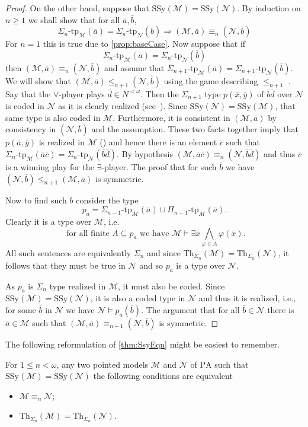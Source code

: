 \documentclass[11pt]{amsart}
\newcommand{\M}{\mathcal{M}}
\newcommand{\N}{\mathcal{N}}
\newcommand{\mc}[1]{\mathcal{#1}}
\newcommand{\PA}{\mathrm{PA}}
\newcommand{\SSy}{\mathrm{SSy}}
\newcommand{\tp}{\mathrm{tp}}
\newcommand{\Th}{\mathrm{Th}}
\def\M{{\mathcal M}}
\def\N{{\mathcal N}}
\theoremstyle{remark}
\newcommand{\ba}{\overline{a}}
\newcommand{\bb}{\overline{b}}
\newcommand{\bc}{\overline{c}}
\newcommand{\bd}{\overline{d}}
\begin{document}
\begin{proof}
    On the other hand, suppose that $\SSy(\mathcal{M}) = \SSy(\mathcal{N})$. By induction on $n\geq 1$ we shall show that for all $\bar{a},\bar{b}$,
\[\Sigma_{n}\text{-}\tp_\M(\ba)=\Sigma_{n}\text{-}\tp_\N(\bb)\Longrightarrow (\mc{M},\bar{a}) \equiv_{n} (\mc{N},\bar{b})\]
    For $n=1$ this is true due to \cref{prop:baseCase}. Now suppose that if $$\Sigma_{n}\text{-}\tp_\M(\ba)=\Sigma_{n}\text{-}\tp_\N(\bb)$$ then $(\mc{M},\bar{a}) \equiv_{n} (\mc{N},\bar{b})$ and assume that $\Sigma_{n+1}\text{-}\tp_\M(\ba)=\Sigma_{n+1}\text{-}\tp_\N(\bb)$. We will show that $(\M,\ba)\leq_{n+1}(\N,\bb)$ using the game describing $\leq_{n+1}$ \cite[Section II.6]{MBook}. Say that the $\forall$-player plays $\bar d\in N^{<\omega}$. 
Then the $\Sigma_{n+1}$ type $p(\bar{x},\bar{y})$ of $\bb\bd$ over $\N$ is coded in $\N$ as it is clearly realized (see~\cite[Lemma 12.1]{Kaye}). Since $\SSy(\N)=\SSy(\M)$, that same type is also coded in $\M$. Furthermore, it is consistent in $(\M,\ba)$ by consistency in $(\N,\bb)$ and the assumption. These two facts together imply that $p(\ba,\bar{y})$ is realized in $\M$ (\cite[Lemma 12.2]{Kaye}) and hence there is an element $\bc$ such that $\Sigma_{n}\text{-}\tp_\M(\ba\bc)=\Sigma_{n}\text{-}\tp_\N(\bb\bd)$. By hypothesis $(\M,\ba\bc)\equiv_{n}(\N,\bb\bd)$ and thus $\bc$ is a winning play for the $\exists$-player. The proof that for such $\bb$ we have $(\N,\bb)\leq_{n+1}(\M,\ba)$ is symmetric.

Now to find such $\bb$ consider the type $$p_a = \Sigma_{n-1}\text{-}\tp_\M(\ba) \cup \Pi_{n-1}\text{-}\tp_\M(\ba).$$ Clearly it is a type over $\M$, i.e. $$\text{ for all finite } A \subseteq p_a \text{ we have }\mathcal{M} \models \exists \bar{x} \bigwedge_{\varphi \in A} \varphi(\bar{x}).$$ All such sentences are equivalently $\Sigma_n$ and since $\Th_{\Sigma_{n}}(\mathcal{M}) =\Th_{\Sigma_{n}}(\mathcal{N})$, it follows that they must be true in $\mc{N}$ and so $p_a$ is a type over $\mathcal{N}$.
    
        As $p_a$ is $\Sigma_{n}$ type realized in $\mathcal{M}$, it must also be coded. Since $\SSy(\mathcal{M})=\SSy(\mathcal{N})$, it is also a coded type in $\mathcal{N}$ and thus it is realized, i.e., for some $\overline{b}$ in $\mathcal{N}$ we have $\mathcal{N} \models p_a(\overline{b})$. 
        The argument that for all $\bar{b}\in\mc{N}$ there is $\bar{a}\in\mc{M}$ such that $(\mc{M},\bar{a})\equiv_{n-1}(\mc{N},\bar{b})$ is symmetric.
\end{proof}
The following reformulation of \cref{thm:SsyEqn} might be easiest to remember.
\begin{corollary}\label{cor:typesEquiv}
    For $1 \le n < \omega$, any two pointed models $\M$ and $\N$ of $\PA$ such that $\SSy(\M)=\SSy(\N)$ the following conditions are equivalent
    \begin{itemize}
        \item $\mc{M}\equiv_n \mc{N}$;
        \item $\Th_{\Sigma_n}(\mc{M}) = \Th_{\Sigma_n}(\mc{N}).$
    \end{itemize}
    
\end{corollary}
\end{document}
